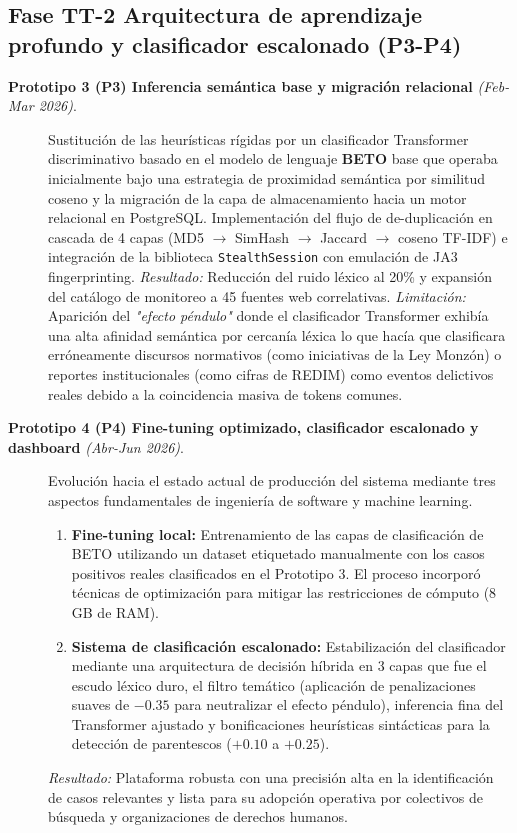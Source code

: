 \subsection{Fase TT-2 Arquitectura de aprendizaje profundo y clasificador escalonado (P3-P4)}
\label{subsec:met_tt2_prototipos}

\begin{description}
    \item[\textbf{Prototipo 3 (P3) Inferencia semántica base y migración relacional} \textit{(Feb-Mar 2026)}.] 
          Sustitución de las heurísticas rígidas por un clasificador Transformer discriminativo basado en el modelo de lenguaje \textbf{BETO} base que operaba inicialmente
          bajo una estrategia de proximidad semántica por similitud coseno y la migración de la capa de almacenamiento hacia un motor relacional en PostgreSQL. Implementación
          del flujo de de-duplicación en cascada de 4 capas (MD5 $\rightarrow$ SimHash $\rightarrow$ Jaccard $\rightarrow$ coseno TF-IDF) e integración de la biblioteca
          \texttt{StealthSession} con emulación de JA3 fingerprinting. 
          \textit{Resultado:} Reducción del ruido léxico al 20\% y expansión del catálogo de monitoreo a 45 fuentes web correlativas.  
          \textit{Limitación:} Aparición del \textit{"efecto péndulo"} donde el clasificador Transformer exhibía una alta afinidad semántica
          por cercanía léxica lo que hacía que clasificara erróneamente discursos normativos (como iniciativas de la Ley Monzón) o reportes
          institucionales (como cifras de REDIM) como eventos delictivos reales debido a la coincidencia masiva de tokens comunes.

    \item[\textbf{Prototipo 4 (P4) Fine-tuning optimizado, clasificador escalonado y dashboard} \textit{(Abr-Jun 2026)}.] 
          Evolución hacia el estado actual de producción del sistema mediante tres aspectos fundamentales de ingeniería de software y machine learning.
          \begin{enumerate}
              \item \textbf{Fine-tuning local:} Entrenamiento de las capas de clasificación de BETO utilizando un dataset etiquetado manualmente con los casos positivos reales clasificados en el Prototipo 3.
              El proceso incorporó técnicas de optimización para mitigar las restricciones de cómputo (8 GB de RAM).
              \item \textbf{Sistema de clasificación escalonado:} Estabilización del clasificador mediante una arquitectura de decisión híbrida en 3 capas que fue el escudo léxico duro,
              el filtro temático (aplicación de penalizaciones suaves de $-0.35$ para neutralizar el efecto péndulo), inferencia fina del Transformer ajustado y bonificaciones heurísticas
              sintácticas para la detección de parentescos ($+0.10$ a $+0.25$).
          \end{enumerate}
          \textit{Resultado:} Plataforma robusta con una precisión alta en la identificación de casos relevantes y lista para su adopción operativa por colectivos de búsqueda y organizaciones de derechos humanos.
\end{description}


